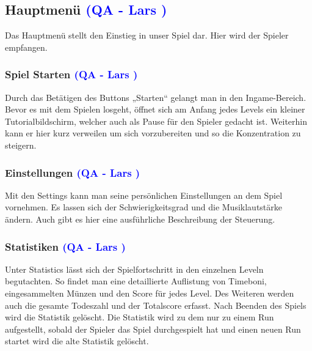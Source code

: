\documentclass{article}
\begin{document}
\vspace{2cm}
\subsection{Hauptmenü \textcolor{blue}{(QA - Lars )}}

Das Hauptmenü stellt den Einstieg in unser Spiel dar. Hier wird der Spieler empfangen.

\vspace{1cm}
\subsubsection{Spiel Starten \textcolor{blue}{(QA - Lars )}}

Durch das Betätigen des Buttons „Starten“ gelangt man in den Ingame-Bereich. Bevor es mit dem Spielen losgeht, öffnet sich am Anfang jedes
Levels ein kleiner Tutorialbildschirm, welcher auch als Pause für den Spieler gedacht ist. Weiterhin kann er hier kurz verweilen um sich vorzubereiten
und so die Konzentration zu steigern.

\vspace{1cm}
\subsubsection{Einstellungen \textcolor{blue}{(QA - Lars )}}

Mit den Settings kann man seine persönlichen Einstellungen an dem Spiel vornehmen. Es lassen sich der Schwierigkeitsgrad und die Musiklautstärke
ändern. Auch gibt es hier eine ausführliche Beschreibung der Steuerung.

\vspace{1cm}
\subsubsection{Statistiken \textcolor{blue}{(QA - Lars )}}

Unter Statistics lässt sich der Spielfortschritt in den einzelnen Leveln begutachten. So findet man eine detaillierte Auflistung von Timeboni, eingesammelten
Münzen und den Score für jedes Level. Des Weiteren werden auch die gesamte Todeszahl und der Totalscore erfasst. Nach Beenden des Spiels wird die Statistik gelöscht. Die Statistik wird zu dem  nur zu einem Run aufgestellt, sobald der Spieler das Spiel durchgespielt hat und einen neuen Run startet wird die alte Statistik gelöscht.
\end{document}
